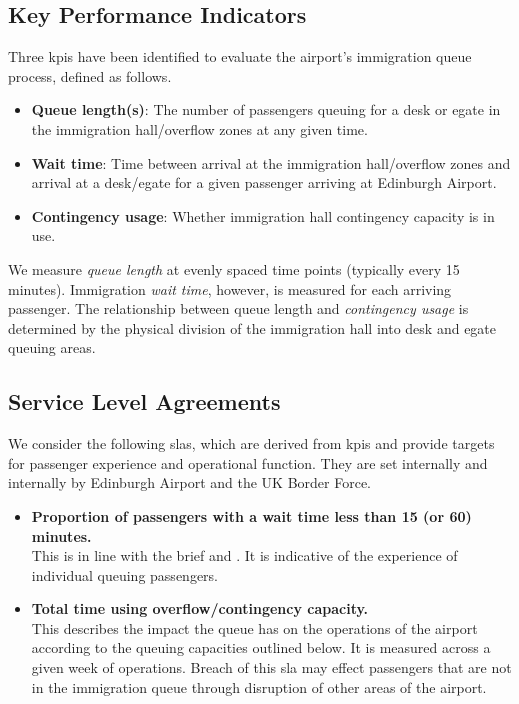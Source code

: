 \documentclass[10pt]{article}
\begin{document}
\subsection{Key Performance Indicators}

Three \glspl{kpi} have been identified to evaluate the airport's immigration queue process, defined as follows.

\begin{itemize}
    \item \textbf{Queue length(s)}: The number of passengers queuing for a desk or \gls{egate} in the immigration hall/overflow zones at any given time.
    \item \textbf{Wait time}: Time between arrival at the immigration hall/overflow zones and arrival at a desk/\gls{egate} for a given passenger arriving at Edinburgh Airport. 
    \item \textbf{Contingency usage}: Whether immigration hall contingency capacity is in use.
\end{itemize}

We measure \textit{queue length} at evenly spaced time points (typically every 15 minutes). Immigration \textit{wait time}, however, is measured for each arriving passenger. The relationship between queue length and \textit{contingency usage} is determined by the physical division of the immigration hall into desk and \gls{egate} queuing areas.

\subsection{Service Level Agreements}
We consider the following \glspl{sla}, which are derived from \glspl{kpi} and provide targets for passenger experience and operational function. They are set internally and internally by Edinburgh Airport and the UK Border Force. 
\begin{itemize}
    \item \textbf{Proportion of passengers with a wait time less than 15 (or 60) minutes.} \\
    This is in line with the brief and \cite{UK_border_2025}. It is indicative of the experience of individual queuing passengers.
    \item \textbf{Total time using overflow/contingency capacity.} \\
    This describes the impact the queue has on the operations of the airport according to the queuing capacities outlined below. It is measured across a given week of operations. Breach of this \gls{sla} may effect passengers that are not in the immigration queue through disruption of other areas of the airport.
\end{itemize}
\end{document}
